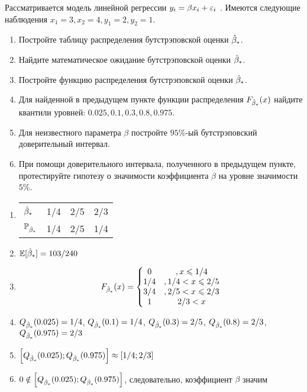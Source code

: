 \begin{problem}
Рассматривается модель линейной регрессии $y_i = \beta x_i + \varepsilon_i$ . Имеются следующие наблюдения $x_1 =3, x_2 =4, y_1 =2, y_2 =1$.
\begin{enumerate}
\item Постройте таблицу распределения бутстрэповской оценки $\hat{\beta}_*$.
\item Найдите математическое ожидание бутстрэповской оценки $\hat{\beta}_*$.
\item Постройте функцию распределения бутстрэповской оценки $\hat{\beta}_*$.
\item Для найденной в предыдущем пункте функции распределения $F_{\hat{\beta}_*}(x)$ найдите квантили уровней: $0.025, 0.1, 0.3, 0.8, 0.975$.
\item Для неизвестного параметра $\beta$ постройте $95\%$-ый бутстрэповский доверительный интервал.
\item При помощи доверительного интервала, полученного в предыдущем пункте, протестируйте гипотезу о значимости коэффициента $\beta$ на уровне значимости $5\%$.
\end{enumerate}


\begin{sol}
\begin{enumerate}
\item

\begin{tabular}{llll}
\toprule
$\hat{\beta}_*$ & 1/4 & 2/5 & 2/3 \\
$\mathbb{P}_{\hat{\beta}_*}$ & 1/4   & 2/5   & 1/4 \\
\bottomrule
\end{tabular}

\item $\mathbb{E} [\hat{\beta}_*] = 103/240$
\item
\[
F_{\hat{\beta}_*}(x) =
\left\{\begin{matrix}
0 & , x \leqslant 1/4 \\
1/4 & ,1/4 < x \leqslant 2/5 \\
3/4 & , 2/5 < x \leqslant 2/3\\
1 & 2/3 < x
\end{matrix}\right.
\]
\item $Q_{\hat{\beta}_*} (0.025) = 1/4$, $Q_{\hat{\beta}_*} (0.1) = 1/4$, $Q_{\hat{\beta}_*} (0.3) = 2/5$, $Q_{\hat{\beta}_*} (0.8) = 2/3$, $Q_{\hat{\beta}_*} (0.975) = 2/3$
\item $\left[ Q_{\hat{\beta}_*} (0.025);  Q_{\hat{\beta}_*} (0.975) \right] \approx \left[1/4; 2/3 \right] $
\item $0 \notin  \left[ Q_{\hat{\beta}_*} (0.025);  Q_{\hat{\beta}_*} (0.975) \right]$, следовательно, коэффициент $\beta$ значим
\end{enumerate}
\end{sol}
\end{problem}


